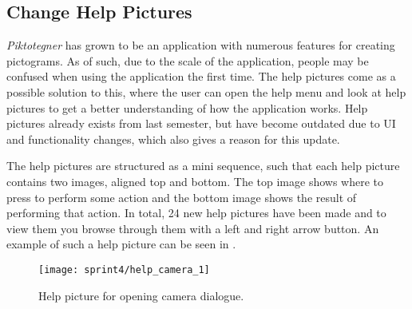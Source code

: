 \subsection*{Change Help Pictures}
\textit{Piktotegner} has grown to be an application with numerous features for creating pictograms.
As of such, due to the scale of the application, people may be confused when using the application the first time.
The help pictures come as a possible solution to this, where the user can open the help menu and look at help pictures to get a better understanding of how the application works.
Help pictures already exists from last semester, but have become outdated due to UI and functionality changes, which also gives a reason for this update. 

The help pictures are structured as a mini sequence, such that each help picture contains two images, aligned top and bottom.
The top image shows where to press to perform some action and the bottom image shows the result of performing that action.
In total, 24 new help pictures have been made and to view them you browse through them with a left and right arrow button.
An example of such a help picture can be seen in .

\begin{figure}[h]
     \centering
     \texttt{[image: sprint4/help\_camera\_1]}
     \caption{Help picture for opening camera dialogue.}
     \label{fig:helpCamera}
\end{figure}



